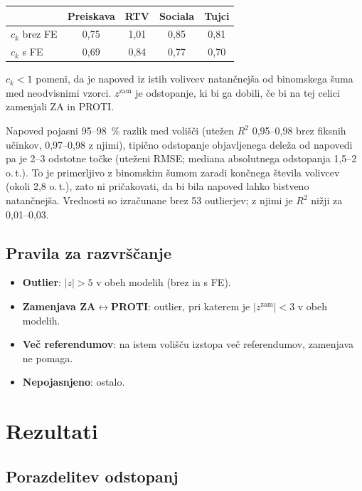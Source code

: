 \documentclass[11pt,a4paper]{article}
\begin{document}
\begin{center}
\begin{tabular}{lcccc}
\toprule
 & Preiskava & RTV & Sociala & Tujci \\
\midrule
$c_k$ brez FE & 0,75 & 1,01 & 0,85 & 0,81 \\
$c_k$ s FE & 0,69 & 0,84 & 0,77 & 0,70 \\
\bottomrule
\end{tabular}
\end{center}

$c_k<1$ pomeni, da je napoved iz istih volivcev natančnejša od binomskega šuma med neodvisnimi vzorci. $z^{\text{zam}}$ je odstopanje, ki bi ga dobili, če bi na tej celici zamenjali ZA in PROTI.

Napoved pojasni 95--98~\% razlik med volišči (utežen $R^2$ 0,95--0,98 brez fiksnih učinkov, 0,97--0,98 z njimi), tipično odstopanje objavljenega deleža od napovedi pa je 2--3 odstotne točke (uteženi RMSE; mediana absolutnega odstopanja 1,5--2 o.\,t.). To je primerljivo z binomskim šumom zaradi končnega števila volivcev (okoli 2,8 o.\,t.), zato ni pričakovati, da bi bila napoved lahko bistveno natančnejša. Vrednosti so izračunane brez 53 outlierjev; z njimi je $R^2$ nižji za 0,01--0,03.

\subsection{Pravila za razvrščanje}
\begin{itemize}
\item \textbf{Outlier}: $|z|>5$ v obeh modelih (brez in s FE).
\item \textbf{Zamenjava ZA$\leftrightarrow$PROTI}: outlier, pri katerem je $|z^{\text{zam}}|<3$ v obeh modelih.
\item \textbf{Več referendumov}: na istem volišču izstopa več referendumov, zamenjava ne pomaga.
\item \textbf{Nepojasnjeno}: ostalo.
\end{itemize}

\section{Rezultati}

\subsection{Porazdelitev odstopanj}
\end{document}
